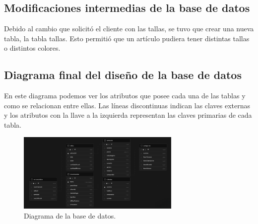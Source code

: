 \subsection{Modificaciones intermedias de la base de datos}

Debido al cambio que solicitó el cliente con las tallas, se tuvo que crear una nueva tabla, la tabla tallas. Esto permitió que un artículo pudiera tener distintas tallas o distintos colores. 


\subsection{Diagrama final del diseño de la base de datos}

En este diagrama podemos ver los atributos que posee cada una de las tablas y como se relacionan entre ellas. Las líneas discontinuas indican las claves externas y los atributos con la llave a la izquierda representan las claves primarias de cada tabla. 

\begin{figure}[H]
	\centering
	\includegraphics[width=0.7\textwidth]{imagenes/imagenesDiagramas/diagramaBD.png}
	\caption{Diagrama de la base de datos.}
	\label{fig:diagramaBD}
\end{figure}


